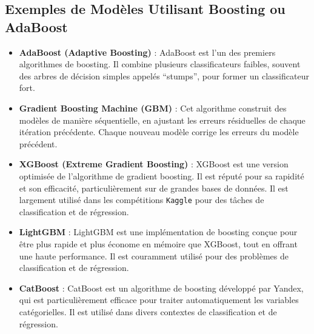 \subsection*{Exemples de Modèles Utilisant Boosting ou AdaBoost}

\begin{itemize}
	\item \textbf{AdaBoost (Adaptive Boosting)} : 
	AdaBoost est l'un des premiers algorithmes de boosting. Il combine plusieurs classificateurs faibles, souvent des arbres de décision simples appelés ``stumps'', pour former un classificateur fort.
	\item \textbf{Gradient Boosting Machine (GBM)} : 
	Cet algorithme construit des modèles de manière séquentielle, en ajustant les erreurs résiduelles de chaque itération précédente. Chaque nouveau modèle corrige les erreurs du modèle précédent.
	
	\item \textbf{XGBoost (Extreme Gradient Boosting)} : 
	XGBoost est une version optimisée de l'algorithme de gradient boosting. Il est réputé pour sa rapidité et son efficacité, particulièrement sur de grandes bases de données. Il est largement utilisé dans les compétitions \texttt{Kaggle} pour des tâches de classification et de régression.
	
	\item \textbf{LightGBM} : 
	LightGBM est une implémentation de boosting conçue pour être plus rapide et plus économe en mémoire que XGBoost, tout en offrant une haute performance. Il est couramment utilisé pour des problèmes de classification et de régression.
	
	\item \textbf{CatBoost} : 
	CatBoost est un algorithme de boosting développé par Yandex, qui est particulièrement efficace pour traiter automatiquement les variables catégorielles. Il est utilisé dans divers contextes de classification et de régression.
\end{itemize}
